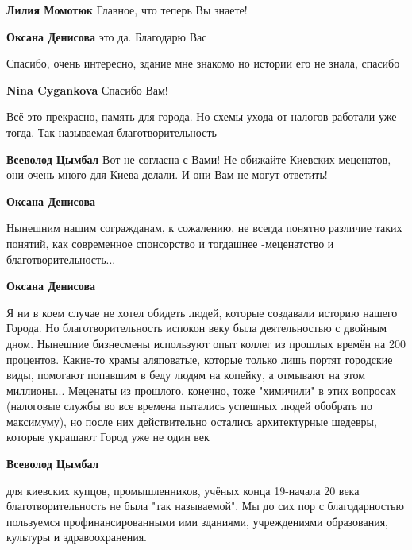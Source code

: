 \begin{itemize}
\begin{itemize} %
\textbf{Лилия Момотюк} Главное, что теперь Вы знаете!

\textbf{Оксана Денисова} это да. Благодарю Вас
\end{itemize} %

Спасибо, очень интересно, здание мне знакомо но истории его не знала, спасибо

\begin{itemize} %
\textbf{Nina Cygankova} Спасибо Вам!
\end{itemize} %


Всё это прекрасно, память для города. Но схемы ухода от налогов работали уже
тогда. Так называемая благотворительность

\begin{itemize} %
\textbf{Всеволод Цымбал} Вот не согласна с Вами! Не обижайте Киевских меценатов, они очень много для Киева делали. И они Вам не могут ответить!

\begin{itemize} %
\textbf{Оксана Денисова} 

Нынешним нашим согражданам, к сожалению, не всегда понятно различие таких
понятий, как современное спонсорство и тогдашнее -меценатство и
благотворительность...


\textbf{Оксана Денисова} 

Я ни в коем случае не хотел обидеть людей, которые создавали историю нашего
Города. Но благотворительность испокон веку была деятельностью с двойным дном.
Нынешние бизнесмены используют опыт коллег из прошлых времён на 200 процентов.
Какие-то храмы аляповатые, которые только лишь портят городские виды, помогают
попавшим в беду людям на копейку, а отмывают на этом миллионы... Меценаты из
прошлого, конечно, тоже "химичили" в этих вопросах (налоговые службы во все
времена пытались успешных людей обобрать по максимуму), но после них
действительно остались архитектурные шедевры, которые украшают Город уже не
один век

\end{itemize} %

\textbf{Всеволод Цымбал} 

для киевских купцов, промышленников, учёных конца 19-начала 20 века
благотворительность не была "так называемой". Мы до сих пор с благодарностью
пользуемся профинансированными ими зданиями, учреждениями образования, культуры
и здравоохранения.


\end{itemize}
\end{itemize}

